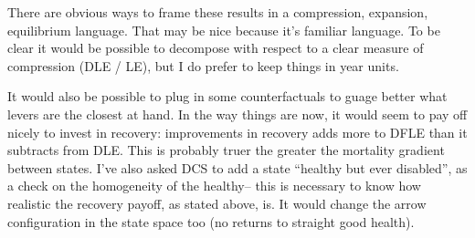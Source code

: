\begin{table}[!ht]
      \caption{Females (all edu)}
      \label{tab:females}
      \centering
{}
     \qquad
{}
\end{table}

There are obvious ways to frame these results in a compression, expansion, equilibrium language. That may be nice because it's familiar language. To be clear it would be possible to decompose with respect to a clear measure of compression (DLE / LE), but I do prefer to keep things in year units.

It would also be possible to plug in some counterfactuals to guage better what levers are the closest at hand. In the way things are now, it would seem to pay off nicely to invest in recovery: improvements in recovery adds more to DFLE than it subtracts from DLE. This is probably truer the greater the mortality gradient between states. I've also asked DCS to add a state ``healthy but ever disabled'', as a check on the homogeneity of the healthy-- this is necessary to know how realistic the recovery payoff, as stated above, is. It would change the arrow configuration in the state space too (no returns to straight good health).
%
%  

